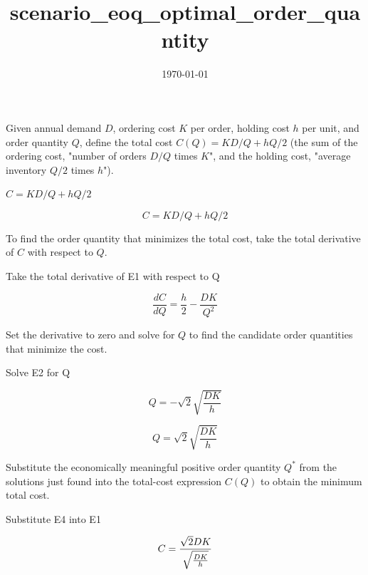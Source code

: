 \documentclass[dvipdfmx]{article}
\title{scenario\_eoq\_optimal\_order\_quantity}
\date{\today}
\begin{document}
\maketitle

Given annual demand $D$, ordering cost $K$ per order, holding cost $h$ per unit, and order quantity $Q$, define the total cost $C(Q)=KD/Q+hQ/2$ (the sum of the ordering cost, "number of orders $D/Q$ times $K$", and the holding cost, "average inventory $Q/2$ times $h$").

$C = K D / Q + h Q / 2$

\begin{equation}
  C = K D / Q + h Q / 2
  \label{eq:E1}
\end{equation}

To find the order quantity that minimizes the total cost, take the total derivative of $C$ with respect to $Q$.

Take the total derivative of E1 with respect to Q

\begin{equation}
  \frac{dC}{dQ} = \frac{h}{2}-\frac{D K}{Q^2}
  \label{eq:E2}
\end{equation}

Set the derivative to zero and solve for $Q$ to find the candidate order quantities that minimize the cost.

Solve E2 for Q

\begin{equation}
  Q = -\sqrt{2} \sqrt{\frac{D K}{h}}
  \label{eq:E3}
\end{equation}

\begin{equation}
  Q = \sqrt{2} \sqrt{\frac{D K}{h}}
  \label{eq:E4}
\end{equation}

Substitute the economically meaningful positive order quantity $Q^*$ from the solutions just found into the total-cost expression $C(Q)$ to obtain the minimum total cost.

Substitute E4 into E1

\begin{equation}
  C = {{\sqrt{2} D K}\over{\sqrt{\frac{D K}{h}}}}
  \label{eq:E5}
\end{equation}
\end{document}
